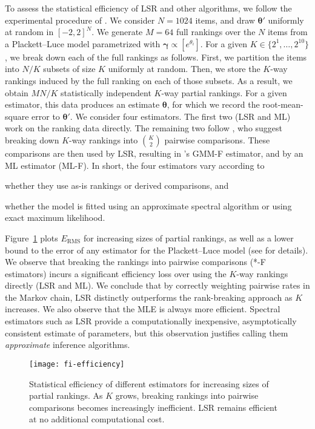 To assess the statistical efficiency of LSR and other algorithms, we follow the experimental procedure of \citet{hajek2014minimax}.
We consider $N = 1024$ items, and draw $\bm{\theta}'$ uniformly at random in $[-2, 2]^N$.
We generate $M = 64$ full rankings over the $N$ items from a Plackett--Luce model parametrized with $\bm{\gamma} \propto [e^{\theta_i}]$.
For a given $K \in \{2^1, \ldots, 2^{10}\}$, we break down each of the full rankings as follows.
First, we partition the items into $N/K$ subsets of size $K$ uniformly at random.
Then, we store the $K$-way rankings induced by the full ranking on each of those subsets.
As a result, we obtain $MN/K$ statistically independent $K$-way partial rankings.
For a given estimator, this data produces an estimate $\bm{\theta}$, for which we record the root-mean-square error to $\bm{\theta}'$.
We consider four estimators.
The first two (LSR and ML) work on the ranking data directly.
The remaining two follow \citet{azari2013generalized}, who suggest breaking down $K$-way rankings into $\binom{K}{2}$ pairwise comparisons.
These comparisons are then used by LSR, resulting in \citeauthor{azari2013generalized}'s GMM-F estimator, and by an ML estimator (ML-F).
In short, the four estimators vary according to
\begin{enuminline}
\item whether they use as-is rankings or derived comparisons, and
\item whether the model is fitted using an approximate spectral algorithm or using exact maximum likelihood.
\end{enuminline}
Figure~\ref{fi:fig:efficiency} plots $E_{\text{RMS}}$ for increasing sizes of partial rankings, as well as a lower bound to the error of any estimator for the Plackett--Luce model (see \citet{hajek2014minimax} for details).
We observe that breaking the rankings into pairwise comparisons (*-F estimators) incurs a significant efficiency loss over using the $K$-way rankings directly (LSR and ML).
We conclude that by correctly weighting pairwise rates in the Markov chain, LSR distinctly outperforms the rank-breaking approach as $K$ increases.
We also observe that the MLE is always more efficient.
Spectral estimators such as LSR provide a computationally inexpensive, asymptotically consistent estimate of parameters, but this observation justifies calling them \emph{approximate} inference algorithms.


\begin{figure}
\centering
\texttt{[image: fi-efficiency]}
\caption{
Statistical efficiency of different estimators for increasing sizes of partial rankings.
As $K$ grows, breaking rankings into pairwise comparisons becomes increasingly inefficient.
LSR remains efficient at no additional computational cost.
}
\label{fi:fig:efficiency}
\end{figure}

